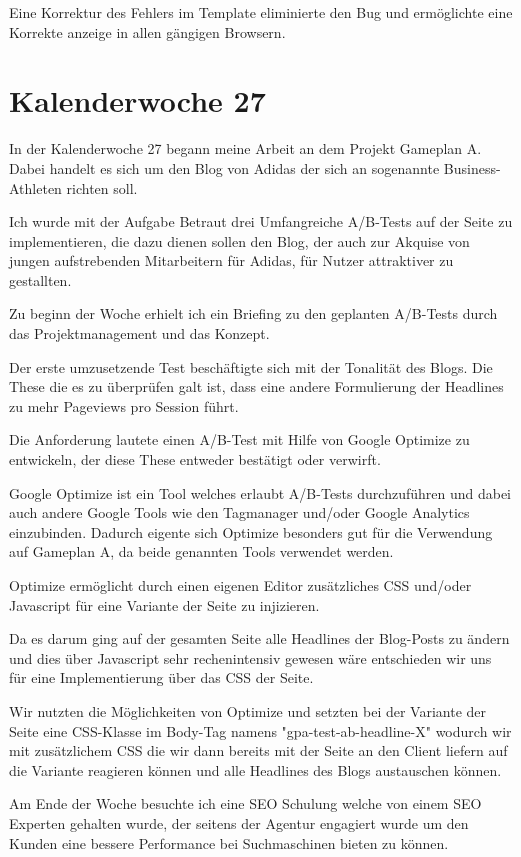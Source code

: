 \documentclass[11pt]{article} %
\begin{document}
Eine Korrektur des Fehlers im Template eliminierte den Bug und ermöglichte eine Korrekte anzeige in allen gängigen Browsern.

\section{Kalenderwoche 27} \label{sec:kw27}

In der Kalenderwoche 27 begann meine Arbeit an dem Projekt Gameplan A. Dabei handelt es sich um den Blog von Adidas der sich an sogenannte Business-Athleten richten soll.

Ich wurde mit der Aufgabe Betraut drei Umfangreiche A/B-Tests auf der Seite zu implementieren, die dazu dienen sollen den Blog, der auch zur Akquise von jungen aufstrebenden Mitarbeitern für Adidas, für Nutzer attraktiver zu gestallten.

Zu beginn der Woche erhielt ich ein Briefing zu den geplanten A/B-Tests durch das Projektmanagement und das Konzept.

Der erste umzusetzende Test beschäftigte sich mit der Tonalität des Blogs. Die These die es zu überprüfen galt ist, dass eine andere Formulierung der Headlines zu mehr Pageviews pro Session führt.

Die Anforderung lautete einen A/B-Test mit Hilfe von Google Optimize zu entwickeln, der diese These entweder bestätigt oder verwirft.

Google Optimize ist ein Tool welches erlaubt A/B-Tests durchzuführen und dabei auch andere Google Tools wie den Tagmanager und/oder Google Analytics einzubinden. Dadurch eigente sich Optimize besonders gut für die Verwendung auf Gameplan A, da beide genannten Tools verwendet werden.

Optimize ermöglicht durch einen eigenen Editor zusätzliches CSS und/oder Javascript für eine Variante der Seite zu injizieren.

Da es darum ging auf der gesamten Seite alle Headlines der Blog-Posts zu ändern und dies über Javascript sehr rechenintensiv gewesen wäre entschieden wir uns für eine Implementierung über das CSS der Seite.

Wir nutzten die Möglichkeiten von Optimize und setzten bei der Variante der Seite eine CSS-Klasse im Body-Tag namens "gpa-test-ab-headline-X" wodurch wir mit zusätzlichem CSS die wir dann bereits mit der Seite an den Client liefern auf die Variante reagieren können und alle Headlines des Blogs austauschen können.

Am Ende der Woche besuchte ich eine SEO Schulung welche von einem SEO Experten gehalten wurde, der seitens der Agentur engagiert wurde um den Kunden eine bessere Performance bei Suchmaschinen bieten zu können.
\end{document}

